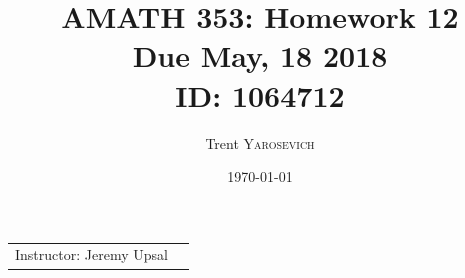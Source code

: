 \documentclass{article}
\title{AMATH 353: Homework 12 \\Due May, 18 2018 \\ ID: 1064712} %
\author{Trent \textsc{Yarosevich}} %
\date{\today} %
\begin{document}
\maketitle %
\setlength\parindent{1cm}

\begin{center}
\begin{tabular}{l r}
Instructor: Jeremy Upsal %
\end{tabular}
\end{center}


\end{document}
